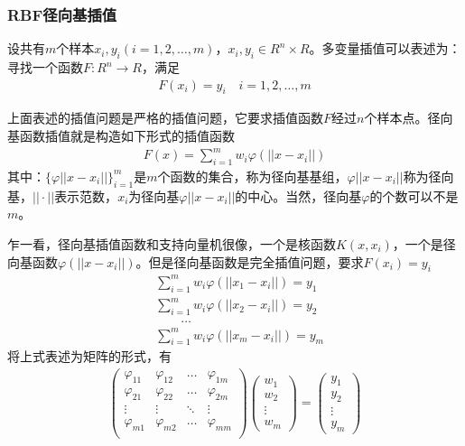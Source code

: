         \subsubsection{RBF径向基插值}
            \par
            设共有$m$个样本$x_i,y_i(i=1,2,\dots,m)$，$x_i,y_i\in R^n\times R$。多变量插值可以表述为：寻找一个函数$F:R^n\rightarrow R$，满足
            \begin{align*}
            F(x_i) = y_i \quad i= 1,2,\dots,m
            \end{align*}
            \par
            上面表述的插值问题是严格的插值问题，它要求插值函数$F$经过$n$个样本点。径向基函数插值就是构造如下形式的插值函数
            \begin{align*}
            F(x) = \sum_{i=1}^m w_i \varphi(||x-x_i||)
            \end{align*}
            其中：$\{\varphi ||x-x_i||\}_{i=1}^m$是$m$个函数的集合，称为径向基基组，$\varphi||x-x_i||$称为径向基，$||\cdot||$表示范数，$x_i$为径向基$\varphi||x-x_i||$的中心。当然，径向基$\varphi$的个数可以不是$m$。
            \par
            乍一看，径向基插值函数和支持向量机很像，一个是核函数$K(x,x_i)$，一个是径向基函数$\varphi(||x-x_i||)$。但是径向基函数是完全插值问题，要求$F(x_i) = y_i$
            \begin{align*}
            & \sum_{i=1}^mw_i\varphi(||x_1 -x_i||) = y_1\\
            & \sum_{i=1}^mw_i\varphi(||x_2 -x_i||) = y_2\\
            & \qquad \dots\\
            & \sum_{i=1}^mw_i\varphi(||x_m -x_i||) = y_m
            \end{align*}
            将上式表述为矩阵的形式，有
            \begin{align*}
            \begin{pmatrix}
            \varphi_{11} & \varphi_{12}& \dots & \varphi_{1m} \\
            \varphi_{21} & \varphi_{22}& \dots & \varphi_{2m} \\
            \vdots&\vdots&\ddots&\vdots\\
            \varphi_{m1} & \varphi_{m2}& \dots & \varphi_{mm} \\
            \end{pmatrix}
            \begin{pmatrix}
            w_1\\
            w_2\\
            \vdots\\
            w_m
            \end{pmatrix}
            =
            \begin{pmatrix}
            y_1\\
            y_2\\
            \vdots\\
            y_m
            \end{pmatrix}
            \end{align*}
